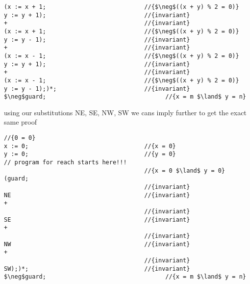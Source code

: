 \documentclass{article}
\begin{document}
\begin{enumerate}[(a)]
\begin{lstlisting}[language=Maple,mathescape=true]
(x := x + 1;                            //{$\neg$((x + y) % 2 = 0)}
y := y + 1);                            //{invariant}
+                                       //{invariant} 
(x := x + 1;                            //{$\neg$((x + y) % 2 = 0)}
y := y - 1);                            //{invariant}
+                                       //{invariant}
(x := x - 1;                            //{$\neg$((x + y) % 2 = 0)}
y := y + 1);                            //{invariant}          
+                                       //{invariant}
(x := x - 1;                            //{$\neg$((x + y) % 2 = 0)}
y := y - 1);)*;                         //{invariant}
$\neg$guard;                                  //{x = m $\land$ y = n}

    \end{lstlisting} 
using our substitutions NE, SE, NW, SW we cans imply further to get the exact same proof
    \begin{lstlisting}[language=Maple,mathescape=true]
                                        //{0 = 0}
x := 0;                                 //{x = 0}
y := 0;                                 //{y = 0}
// program for reach starts here!!!
                                        //{x = 0 $\land$ y = 0}
(guard;
                                        //{invariant}
NE                                      //{invariant}
+                                        
                                        //{invariant}
SE                                      //{invariant}
+                                       
                                        //{invariant}
NW                                      //{invariant}
+       
                                        //{invariant}
SW);)*;                                 //{invariant}
$\neg$guard;                                  //{x = m $\land$ y = n}

    \end{lstlisting}
\end{enumerate}

\newpage
\end{document}
